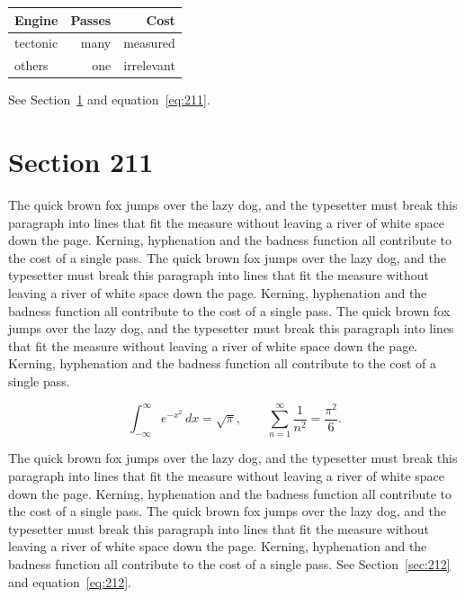 \documentclass{article}
\begin{document}
\begin{center}
\begin{tabular}{lrr}
\toprule
Engine & Passes & Cost \\
\midrule
tectonic & many & measured \\
others & one & irrelevant \\
\bottomrule
\end{tabular}
\end{center}

See Section~\ref{sec:211} and equation~\eqref{eq:211}.
\section{Section 211}
\label{sec:211}
The quick brown fox jumps over the lazy dog, and the typesetter must break this paragraph into lines that fit the measure without leaving a river of white space down the page. Kerning, hyphenation and the badness function all contribute to the cost of a single pass. The quick brown fox jumps over the lazy dog, and the typesetter must break this paragraph into lines that fit the measure without leaving a river of white space down the page. Kerning, hyphenation and the badness function all contribute to the cost of a single pass. The quick brown fox jumps over the lazy dog, and the typesetter must break this paragraph into lines that fit the measure without leaving a river of white space down the page. Kerning, hyphenation and the badness function all contribute to the cost of a single pass. 

\begin{equation}\label{eq:211}
\int_{-\infty}^{\infty} e^{-x^{2}}\,dx = \sqrt{\pi}, \qquad
\sum_{n=1}^{\infty} \frac{1}{n^{2}} = \frac{\pi^{2}}{6}.
\end{equation}

The quick brown fox jumps over the lazy dog, and the typesetter must break this paragraph into lines that fit the measure without leaving a river of white space down the page. Kerning, hyphenation and the badness function all contribute to the cost of a single pass. The quick brown fox jumps over the lazy dog, and the typesetter must break this paragraph into lines that fit the measure without leaving a river of white space down the page. Kerning, hyphenation and the badness function all contribute to the cost of a single pass. 
See Section~\ref{sec:212} and equation~\eqref{eq:212}.
\end{document}
